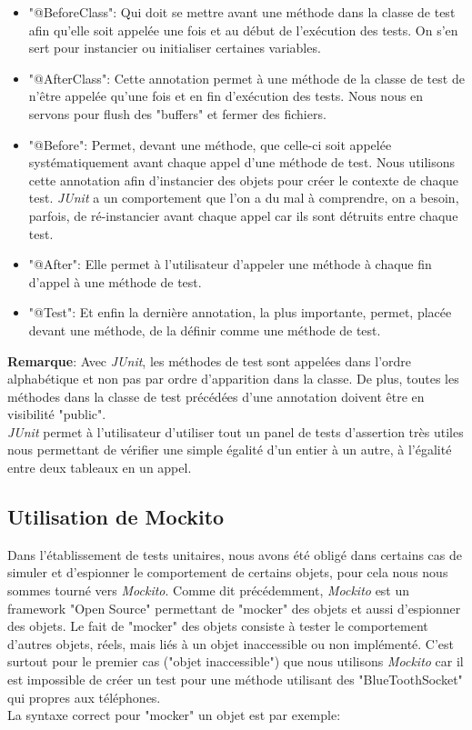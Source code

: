 \begin{itemize}
\item "@BeforeClass": Qui doit se mettre avant une méthode dans la classe de test afin qu'elle soit appelée une fois et au début de l'exécution des tests. On s'en sert pour instancier ou initialiser certaines variables.\\
\item "@AfterClass": Cette annotation permet à une méthode de la classe de test de n'être appelée qu'une fois et en fin d'exécution des tests. Nous nous en servons pour flush des "buffers" et fermer des fichiers.\\
\item "@Before": Permet, devant une méthode, que celle-ci soit appelée systématiquement avant chaque appel d'une méthode de test. Nous utilisons cette annotation afin d'instancier des objets pour créer le contexte de chaque test. \textit{JUnit} a un comportement que l'on a du mal à comprendre, on a besoin, parfois, de ré-instancier avant chaque appel car ils sont détruits entre chaque test.\\
\item "@After": Elle permet à l'utilisateur d'appeler une méthode à chaque fin d'appel à une méthode de test.\\
\item "@Test": Et enfin la dernière annotation, la plus importante, permet, placée devant une méthode, de la définir comme une méthode de test.\\
\end{itemize}

\textbf{Remarque}: Avec \textit{JUnit}, les méthodes de test sont appelées dans l'ordre alphabétique et non pas par ordre d'apparition dans la classe. De plus, toutes les méthodes dans la classe de test précédées d'une annotation doivent être en visibilité "public".\\

\textit{JUnit} permet à l'utilisateur d'utiliser tout un panel de tests d'assertion très utiles nous permettant de vérifier une simple égalité d'un entier à un autre, à l'égalité entre deux tableaux en un appel. 

\subsection{Utilisation de Mockito}

Dans l'établissement de tests unitaires, nous avons été obligé dans certains cas de simuler et d'espionner le comportement de certains objets, pour cela nous nous sommes tourné vers \textit{Mockito}. Comme dit précédemment, \textit{Mockito} est un framework "Open Source" permettant de "mocker" des objets et aussi d'espionner des objets. Le fait de "mocker" des objets consiste à tester le comportement d'autres objets, réels, mais liés à un objet inaccessible ou non implémenté. C'est surtout pour le premier cas ("objet inaccessible") que nous utilisons \textit{Mockito} car il est impossible de créer un test pour une méthode utilisant des "BlueToothSocket" qui propres aux téléphones.\\
La syntaxe correct pour "mocker" un objet est par exemple:

